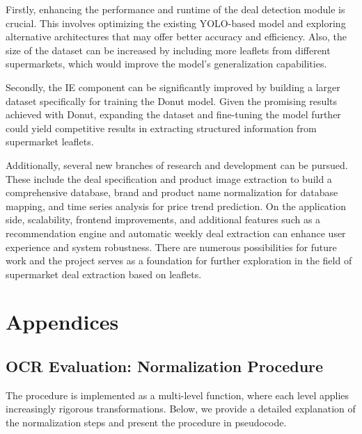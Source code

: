 \documentclass[11pt]{article}
\begin{document}
    Firstly, enhancing the performance and runtime of the deal detection module is crucial. This involves optimizing the existing YOLO-based model and exploring alternative architectures that may offer better accuracy and efficiency. Also, the size of the dataset can be increased by including more leaflets from different supermarkets, which would improve the model's generalization capabilities.

    Secondly, the IE component can be significantly improved by building a larger dataset specifically for training the Donut model. Given the promising results achieved with Donut, expanding the dataset and fine-tuning the model further could yield competitive results in extracting structured information from supermarket leaflets.

    Additionally, several new branches of research and development can be pursued. These include the deal specification and product image extraction to build a comprehensive database, brand and product name normalization for database mapping, and time series analysis for price trend prediction. On the application side, scalability, frontend improvements, and additional features such as a recommendation engine and automatic weekly deal extraction can enhance user experience and system robustness. There are numerous possibilities for future work and the project serves as a foundation for further exploration in the field of supermarket deal extraction based on leaflets.


\newpage

\appendix
\section*{Appendices}
\renewcommand{\thesubsection}{\Alph{subsection}}

\subsection{OCR Evaluation: Normalization Procedure}
\label{app:ocr_normalization}
The procedure is implemented as a multi-level function, where each level applies increasingly rigorous transformations. Below, we provide a detailed explanation of the normalization steps and present the procedure in pseudocode.
\end{document}
